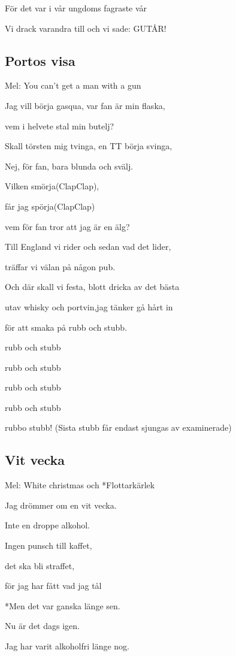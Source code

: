 För det var i vår ungdoms fagraste vår

Vi drack varandra till och vi sade: GUTÅR! 

\subsection{\textbf{Portos visa}}

Mel: You can’t get a man with a gun\bigskip


Jag vill börja gasqua, var fan är min flaska,

vem i helvete stal min butelj?

Skall törsten mig tvinga, en TT börja svinga,

Nej, för fan, bara blunda och svälj.\bigskip

Vilken smörja(ClapClap),

får jag spörja(ClapClap)

vem för fan tror att jag är en älg? \bigskip

Till England vi rider och sedan vad det lider,

träffar vi välan på någon pub.

Och där skall vi festa, blott dricka av det bästa

utav whisky och portvin,jag tänker gå hårt in

för att smaka på rubb och stubb.

rubb och stubb

rubb och stubb

rubb och stubb

rubb och stubb

rubbo stubb! (Sista stubb får endast sjungas av 
examinerade)

\subsection{\textbf{Vit vecka}}

Mel: White christmas och *Flottarkärlek\bigskip


Jag drömmer om en vit vecka.

Inte en droppe alkohol.

Ingen punsch till kaffet,

det ska bli straffet,

för jag har fått vad jag tål

*Men det var ganska länge sen.

Nu är det dags igen.

Jag har varit alkoholfri länge nog.

